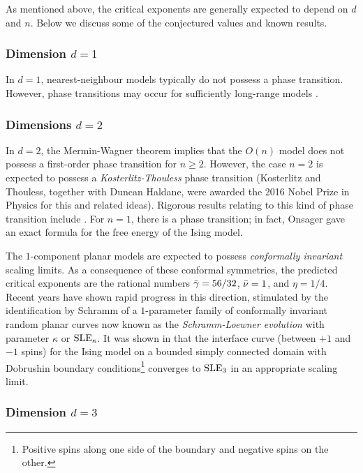 As mentioned above, the critical exponents are generally expected to depend on
$d$ and $n$. Below we discuss some of the conjectured values and known results.

\subsubsection{Dimension $d = 1$}

In $d = 1$, nearest-neighbour models typically do not possess a phase transition.
However, phase transitions may occur for sufficiently long-range models \cite{Dyso69}.

\subsubsection{Dimensions $d = 2$}

In $d = 2$, the Mermin-Wagner theorem \cite{MW66} implies that the $O(n)$ model does
not possess a first-order phase transition for $n \ge 2$. However, the case $n = 2$
is expected to possess a \emph{Kosterlitz-Thouless} phase transition \cite{KT73}
(Kosterlitz and Thouless, together with Duncan Haldane, were awarded
the 2016 Nobel Prize in Physics for this and related ideas). Rigorous results relating
to this kind of phase transition include \cite{FS81,DH00,Falc12,Falc13}.
For $n = 1$, there is a phase transition; in fact, Onsager \cite{Onsager44} gave an
exact formula for the free energy of the Ising model.

The $1$-component planar models are expected to possess \emph{conformally invariant}
scaling limits. As a consequence of these conformal symmetries,
the predicted critical exponents are the rational numbers $\bar\gamma = 56/32$, $\bar\nu = 1$,
and $\eta = 1/4$. Recent years have shown rapid progress in this direction, stimulated
by the identification by Schramm \cite{Schramm00} of a $1$-parameter family of
conformally invariant random planar curves now known as the \emph{Schramm-Loewner
evolution} with parameter $\kappa$ or ${\rm SLE}_\kappa$. It was shown in \cite{CDHKS14}
that the interface curve (between $+ 1$ and $-1$ spins) for the Ising model on a
bounded simply connected domain with Dobrushin boundary
conditions\footnote{Positive spins along one side of the
boundary and negative spins on the other.} converges to ${\rm SLE}_3$ in
an appropriate scaling limit.

\subsubsection{Dimension $d=3$}

